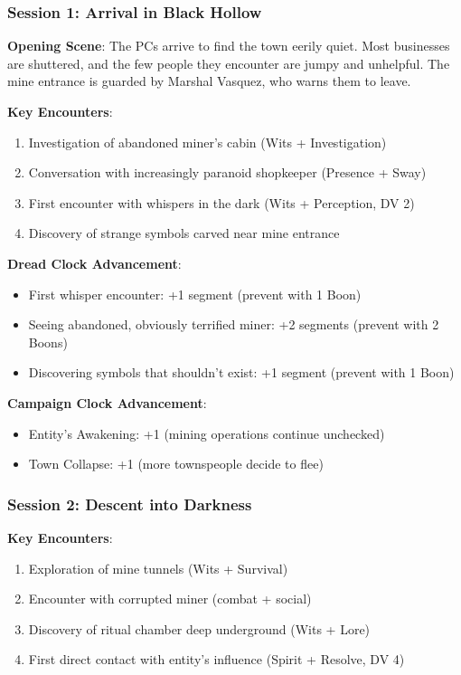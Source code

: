 \documentclass[11pt]{article}
\begin{document}
\subsubsection*{Session 1: Arrival in Black Hollow}

\textbf{Opening Scene}: The PCs arrive to find the town eerily quiet. Most businesses are shuttered, and the few people they encounter are jumpy and unhelpful. The mine entrance is guarded by Marshal Vasquez, who warns them to leave.

\textbf{Key Encounters}:
\begin{enumerate}[leftmargin=*]
\item Investigation of abandoned miner's cabin (Wits + Investigation)
\item Conversation with increasingly paranoid shopkeeper (Presence + Sway)
\item First encounter with whispers in the dark (Wits + Perception, DV 2)
\item Discovery of strange symbols carved near mine entrance
\end{enumerate}

\textbf{Dread Clock Advancement}: 
\begin{itemize}[leftmargin=*]
\item First whisper encounter: +1 segment (prevent with 1 Boon)
\item Seeing abandoned, obviously terrified miner: +2 segments (prevent with 2 Boons)
\item Discovering symbols that shouldn't exist: +1 segment (prevent with 1 Boon)
\end{itemize}

\textbf{Campaign Clock Advancement}:
\begin{itemize}[leftmargin=*]
\item Entity's Awakening: +1 (mining operations continue unchecked)
\item Town Collapse: +1 (more townspeople decide to flee)
\end{itemize}

\subsubsection*{Session 2: Descent into Darkness}

\textbf{Key Encounters}:
\begin{enumerate}[leftmargin=*]
\item Exploration of mine tunnels (Wits + Survival)
\item Encounter with corrupted miner (combat + social)
\item Discovery of ritual chamber deep underground (Wits + Lore)
\item First direct contact with entity's influence (Spirit + Resolve, DV 4)
\end{enumerate}
\end{document}
